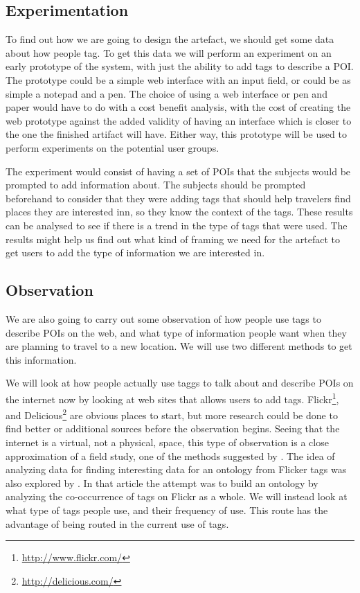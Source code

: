 \subsection{Experimentation}
To find out how we are going to design the artefact, we should get some data about how people tag.
To get this data we will perform an experiment on an early prototype of the system, with just the ability to add tags to describe a POI. 
The prototype could be a simple web interface with an input field, or could be as simple a notepad and a pen.
The choice of using a web interface or pen and paper would have to do with a cost benefit analysis, with the cost of creating the web prototype against the added validity of having an interface which is closer to the one the finished artifact will have.
Either way, this prototype will be used to perform experiments on the potential user groups. 

The experiment would consist of having a set of POIs that the subjects would be prompted to add information about. 
The subjects should be prompted beforehand to consider that they were adding tags that should help travelers find places they are interested inn, so they know the context of the tags.
These results can be analysed to see if there is a trend in the type of tags that were used. 
The results might help us find out what kind of framing we need for the artefact to get users to add the type of information we are interested in.

\subsection{Observation}
We are also going to carry out some observation of how people use tags to describe POIs on the web, and what type of information people want when they are planning to travel to a new location.
We will use two different methods to get this information.

We will look at how people actually use taggs to talk about and describe POIs on the internet now by looking at web sites that allows users to add tags. 
Flickr\footnote{\url{http://www.flickr.com/}}, and Delicious\footnote{\url{http://delicious.com/}} are obvious places to start, but more research could be done to find better or additional sources before the observation begins.
Seeing that the internet is a virtual, not a physical, space, this type of observation is a close approximation of a field study, one of the methods suggested by \citet{Chen1990}.
The idea of analyzing data for finding interesting data for an ontology from Flicker tags was also explored by \citet{Schmitz2006}. 
In that article the attempt was to build an ontology by analyzing the co-occurrence of tags on Flickr as a whole. 
We will instead look at what type of tags people use, and their frequency of use.
This route has the advantage of being routed in the current use of tags. 

